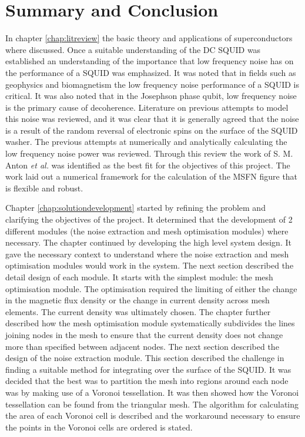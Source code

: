 \graphicspath{{conclusion/fig/}}

\chapter{Summary and Conclusion}
\label{chap:conclusion}

In chapter \ref{chap:litreview} the basic theory and applications of superconductors where discussed. Once a suitable understanding of the DC SQUID was established an understanding of the importance that low frequency noise has on the performance of a SQUID was emphasized. It was noted that in fields such as geophysics and  biomagnetism the low frequency noise performance of a SQUID is critical. It was also noted that in the Josephson phase qubit, low frequency noise is the primary cause of decoherence. Literature on previous attempts to model this noise was reviewed, and it was clear that it is generally agreed that the noise is a result of the random reversal of electronic spins on the surface of the SQUID washer. The previous attempts at numerically and analytically calculating the low frequency noise power was reviewed. Through this review the work of S. M. Anton \textit{et al.} was identified as the best fit for the objectives of this project. The work laid out a numerical framework for the calculation of the MSFN figure that is flexible and robust. \par
Chapter \ref{chap:solutiondevelopment} started by refining the problem and clarifying the objectives of the project. It determined that the development of 2 different modules (the noise extraction and mesh optimisation modules) where necessary. The chapter continued by developing the high level system design. It gave the necessary context to understand where the noise extraction and mesh optimisation modules would work in the system. The next section described the detail design of each module. It starts with the simplest module: the mesh optimisation module. The optimisation required the limiting of either the change in the magnetic flux density or the change in current density across mesh elements. The current density was ultimately chosen. The chapter further described how the mesh optimisation module systematically subdivides the lines joining nodes in the mesh to ensure that the current density does not change more than specified between adjacent nodes. The next section described the design of the noise extraction module. This section described the challenge in finding a suitable method for integrating over the surface of the SQUID. It was decided that the best was to partition the mesh into regions around each node was by making use of a Voronoi tessellation. It was then showed how the Voronoi tessellation can be found from the triangular mesh. The algorithm for calculating the area of each Voronoi cell is described and the workaround necessary to ensure the points in the Voronoi cells are ordered is stated. 
